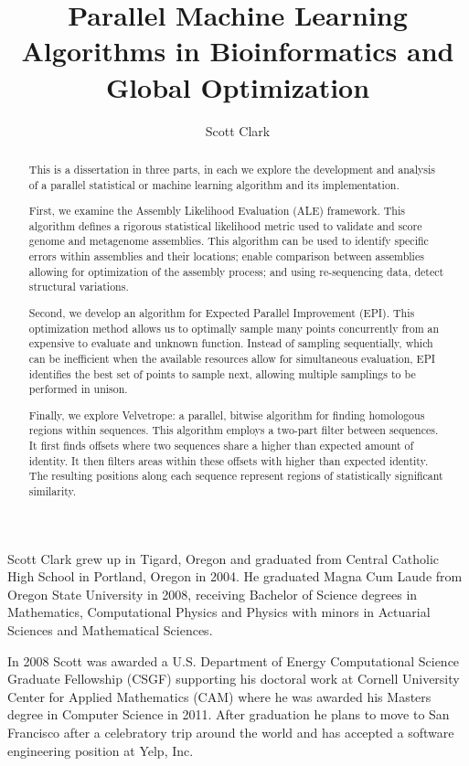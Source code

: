 \documentclass[phd,tocprelim]{cornell}
\title {Parallel Machine Learning Algorithms in Bioinformatics and Global Optimization}
\author {Scott Clark}
\begin{document}
\maketitle
\makecopyright

\begin{abstract}
This is a dissertation in three parts, in each we explore the development and analysis of a parallel statistical or machine learning algorithm and its implementation.

First, we examine the Assembly Likelihood Evaluation (ALE) framework. This algorithm defines a rigorous statistical likelihood metric used to validate and score genome and metagenome assemblies. This algorithm can be used to identify specific errors within assemblies and their locations; enable comparison between assemblies allowing for optimization of the assembly process; and using re-sequencing data, detect structural variations.

Second, we develop an algorithm for Expected Parallel Improvement (EPI). This optimization method allows us to optimally sample many points concurrently from an expensive to evaluate and unknown function. Instead of sampling sequentially, which can be inefficient when the available resources allow for simultaneous evaluation, EPI identifies the best set of points to sample next, allowing multiple samplings to be performed in unison.

Finally, we explore Velvetrope: a parallel, bitwise algorithm for finding homologous regions within sequences. This algorithm employs a two-part filter between sequences. It first finds offsets where two sequences share a higher than expected amount of identity. It then filters areas within these offsets with higher than expected identity. The resulting positions along each sequence represent regions of statistically significant similarity.
\end{abstract}

\begin{biosketch}
Scott Clark grew up in Tigard, Oregon and graduated from Central Catholic High School in Portland, Oregon in 2004. He graduated Magna Cum Laude from Oregon State University in 2008, receiving Bachelor of Science degrees in Mathematics, Computational Physics and Physics with minors in Actuarial Sciences and Mathematical Sciences.

In 2008 Scott was awarded a U.S. Department of Energy Computational Science Graduate Fellowship (CSGF) supporting his doctoral work at Cornell University Center for Applied Mathematics (CAM) where he was awarded his Masters degree in Computer Science in 2011. After graduation he plans to move to San Francisco after a celebratory trip around the world and has accepted a software engineering position at Yelp, Inc.
\end{biosketch}
\end{document}
